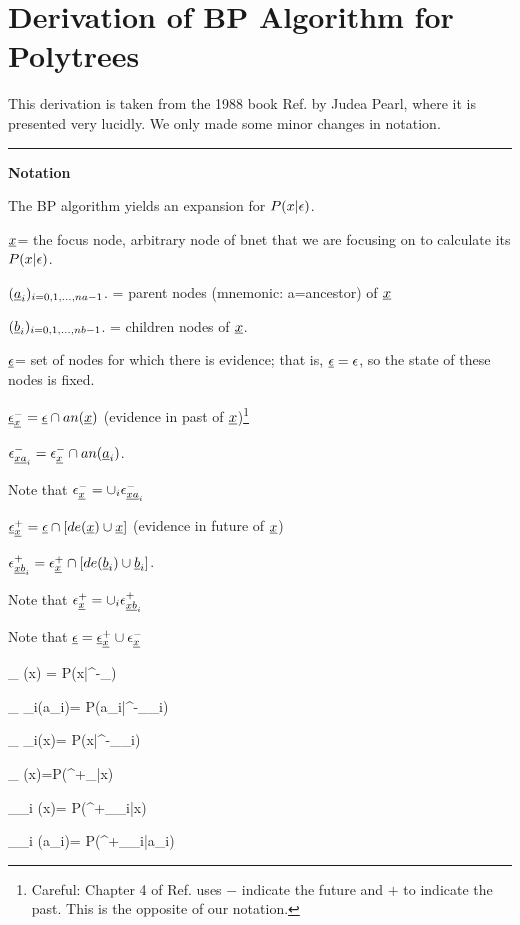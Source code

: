 \section{Derivation of BP Algorithm
for Polytrees}

This derivation is taken from
 the 1988 book Ref.\cite{pearl-1988book}
by Judea Pearl, where it
is presented very lucidly. We only
made some minor
changes in notation.

\hrule\noindent
 {\bf Notation}

The BP algorithm yields an expansion
 for $P(x|\epsilon)$.

${\underline{x}}$= the focus node,
arbitrary node of bnet that we are
focusing on to calculate its $P(x|\epsilon)$.



$({\underline{a}}_i)_{i=0,1, \ldots, na-1}$. = parent nodes
 (mnemonic: a=ancestor) of ${\underline{x}}$

$({\underline{b}}_i)_{i=0,1, \ldots, nb-1}$. =
children nodes of ${\underline{x}}$.

$\underline{\epsilon}$= set of nodes for which
 there is evidence; that is,
$\underline{\epsilon}=\epsilon$, so
the state of these nodes is fixed.


$\underline{\epsilon}^-_{\underline{x}}= \underline{\epsilon}\cap an({\underline{x}})$
(evidence in past of ${\underline{x}}$)\footnote{
Careful:
Chapter 4
of Ref.\cite{pearl-1988book}
uses $-$ indicate the future
and $+$ to indicate
 the past. This
is the opposite of our notation.}

$\epsilon^-_{{\underline{x}} {\underline{a}}_i}=
\epsilon^-_{{\underline{x}}}\cap an({\underline{a}}_i)$.

Note that $\epsilon^-_{\underline{x}}=\cup_i 
\epsilon^-_{{\underline{x}} {\underline{a}}_i}$

$\underline{\epsilon}^+_{\underline{x}}= \underline{\epsilon}\cap [de({\underline{x}})\cup{\underline{x}}]$
(evidence in future of ${\underline{x}}$)

$\epsilon^+_{{\underline{x}} {\underline{b}}_i}=
\epsilon^+_{{\underline{x}}}\cap
 [de({\underline{b}}_i)\cup {\underline{b}}_i]$.

Note that $\epsilon^+_{\underline{x}}=\cup_i 
\epsilon^+_{{\underline{x}} {\underline{b}}_i}$

Note that $\underline{\epsilon}=\underline{\epsilon}^+_{\underline{x}} \cup \epsilon^-_{\underline{x}}$

\beq
\pi_{ \rvx}(x)
=
P(x|\eps^-_\rvx)
\eeq

\beq
\pi_{ \rvx\ldart\rva_i}(a_i)=
P(a_i|\eps^-_{\rvx \rva_i})
\eeq

\beq
\pi_{ \rvb_i\ldart\rvx}(x)=
P(x|\eps^-_{\rvx \rvb_i})
\eeq

\beq
\lam_{\rvx} (x)=P(\eps^+_\rvx|x)
\eeq

\beq
\lam_{\rvb_i\rdart \rvx} (x)=
P(\eps^+_{\rvx \rvb_i}|x)
\eeq

\beq
\lam_{\rvx\rdart \rva_i} (a_i)=
P(\eps^+_{\rvx \rva_i}|a_i)
\eeq


